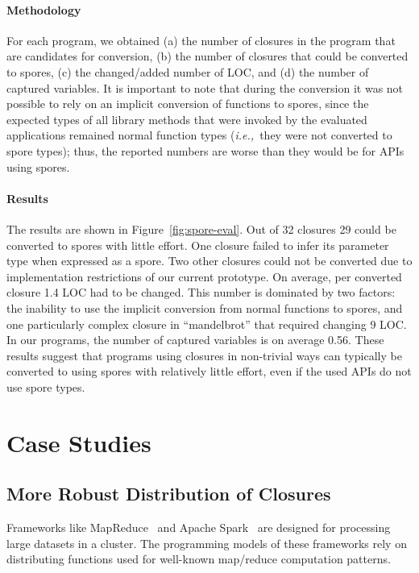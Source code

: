 \documentclass{llncs}
\newcommand{\ie}{{\em i.e.,~}}
\begin{document}
\paragraph{Methodology} For each program, we obtained (a) the number of closures in the program that are candidates for conversion, (b) the number of closures that could be converted to spores, (c) the changed/added number of LOC, and (d) the number of captured variables. It is important to note that during the conversion it was not possible to rely on an implicit conversion of functions to spores, since the expected types of all library methods that were invoked by the evaluated applications remained normal function types (\ie they were not converted to spore types); thus, the reported numbers are worse than they would be for APIs using spores.

\paragraph{Results} The results are shown in Figure~\ref{fig:spore-eval}. Out of 32 closures 29 could be converted to spores with little effort. One closure failed to infer its parameter type when expressed as a spore. Two other closures could not be converted due to implementation restrictions of our current prototype. On average, per converted closure 1.4 LOC had to be changed. This number is dominated by two factors: the inability to use the implicit conversion from normal functions to spores, and one particularly complex closure in ``mandelbrot'' that required changing 9 LOC. In our programs, the number of captured variables is on average 0.56. These results suggest that programs using closures in non-trivial ways can typically be converted to using spores with relatively little effort, even if the used APIs do not use spore types.


\section{Case Studies}
\label{sec:case-studies}

\subsection{More Robust Distribution of Closures}

Frameworks like MapReduce~\cite{MapReduce} and Apache Spark~\cite{Spark} are designed for processing large datasets in a cluster. The programming models of these frameworks rely on distributing functions used for well-known map/reduce computation patterns.
\end{document}
